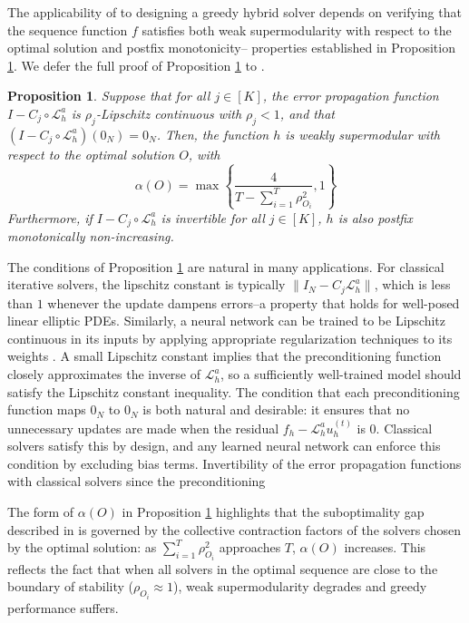 \documentclass{article} %
\newtheorem{proposition}[theorem]{Proposition}
\begin{document}
The applicability of  to designing a greedy hybrid solver depends on verifying that the sequence function $f$ satisfies both weak supermodularity with respect to the optimal solution and postfix monotonicity-- properties established in Proposition \ref{th:weaklyalphasupermodular}. We defer the full proof of Proposition \ref{th:weaklyalphasupermodular} to .

\begin{proposition} \label{th:weaklyalphasupermodular}
    Suppose that for all $j \in [K]$, the error propagation function $I - C_j \circ \mathcal{L}_h^a$ is $\rho_j$-Lipschitz continuous with $\rho_j < 1$, and that $(I - C_j \circ \mathcal{L}_h^a) (0_N) = 0_N$. Then, the function $h$ is weakly supermodular with respect to the optimal solution $O$, with $$\alpha(O) = \max\left\{\frac{4}{T - \sum_{i = 1}^{T} \rho_{O_i}^2} , 1\right\}$$Furthermore, if $I - C_j \circ \mathcal{L}_h^a$ is invertible for all $j \in [K]$, $h$ is also postfix monotonically non-increasing.
\end{proposition}
The conditions of Proposition \ref{th:weaklyalphasupermodular} are natural in many applications. For classical iterative solvers, the lipschitz constant is typically $\|I_N - C_j \mathcal{L}^a_h\|$, which is less than $1$ whenever the update dampens errors--a property that holds for well-posed linear elliptic PDEs. Similarly, a neural network can be trained to be Lipschitz continuous in its inputs by applying appropriate regularization techniques to its weights \citep{gouk2021regularisation}. A small Lipschitz constant implies that the preconditioning function closely approximates the inverse of $\mathcal{L}^a_h$, so a sufficiently well-trained model should satisfy the Lipschitz constant inequality. The condition that each preconditioning function maps $0_N$ to $0_N$ is both natural and desirable: it ensures that no unnecessary updates are made when the residual $f_h - \mathcal{L}^a_h u_h^{(t)}$ is $0$. Classical solvers satisfy this by design, and any learned neural network can enforce this condition by excluding bias terms. Invertibility of the error propagation functions with classical solvers since the preconditioning 


The form of $\alpha(O)$ in Proposition \ref{th:weaklyalphasupermodular} highlights that the suboptimality gap described in  is governed by the collective contraction factors of the solvers chosen by the optimal solution: as $\sum_{i = 1}^{T} \rho_{O_i}^2$ approaches $T$, $\alpha(O)$ increases. This reflects the fact that when all solvers in the optimal sequence are close to the boundary of stability ($\rho_{O_i} \approx 1$), weak supermodularity degrades and greedy performance suffers.
\end{document}
